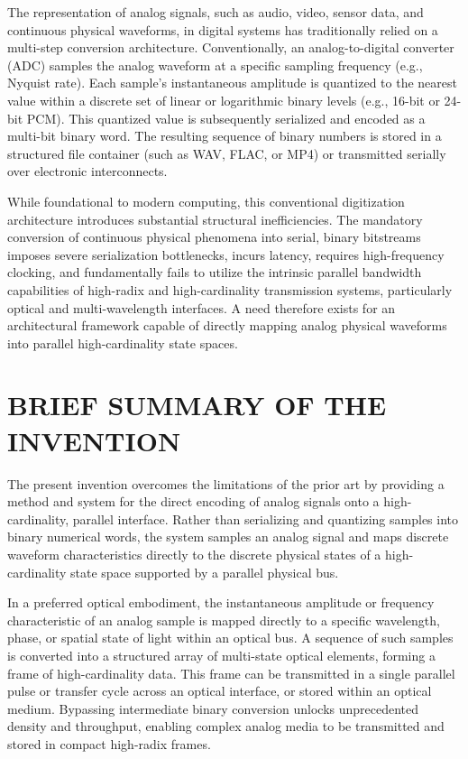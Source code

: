 \documentclass[11pt,letterpaper]{article}
\begin{document}
The representation of analog signals, such as audio, video, sensor data, and continuous physical waveforms, in digital systems has traditionally relied on a multi-step conversion architecture. Conventionally, an analog-to-digital converter (ADC) samples the analog waveform at a specific sampling frequency (e.g., Nyquist rate). Each sample's instantaneous amplitude is quantized to the nearest value within a discrete set of linear or logarithmic binary levels (e.g., 16-bit or 24-bit PCM). This quantized value is subsequently serialized and encoded as a multi-bit binary word. The resulting sequence of binary numbers is stored in a structured file container (such as WAV, FLAC, or MP4) or transmitted serially over electronic interconnects.

While foundational to modern computing, this conventional digitization architecture introduces substantial structural inefficiencies. The mandatory conversion of continuous physical phenomena into serial, binary bitstreams imposes severe serialization bottlenecks, incurs latency, requires high-frequency clocking, and fundamentally fails to utilize the intrinsic parallel bandwidth capabilities of high-radix and high-cardinality transmission systems, particularly optical and multi-wavelength interfaces. A need therefore exists for an architectural framework capable of directly mapping analog physical waveforms into parallel high-cardinality state spaces.

\section*{BRIEF SUMMARY OF THE INVENTION}

The present invention overcomes the limitations of the prior art by providing a method and system for the direct encoding of analog signals onto a high-cardinality, parallel interface. Rather than serializing and quantizing samples into binary numerical words, the system samples an analog signal and maps discrete waveform characteristics directly to the discrete physical states of a high-cardinality state space supported by a parallel physical bus.

In a preferred optical embodiment, the instantaneous amplitude or frequency characteristic of an analog sample is mapped directly to a specific wavelength, phase, or spatial state of light within an optical bus. A sequence of such samples is converted into a structured array of multi-state optical elements, forming a frame of high-cardinality data. This frame can be transmitted in a single parallel pulse or transfer cycle across an optical interface, or stored within an optical medium. Bypassing intermediate binary conversion unlocks unprecedented density and throughput, enabling complex analog media to be transmitted and stored in compact high-radix frames.
\end{document}
